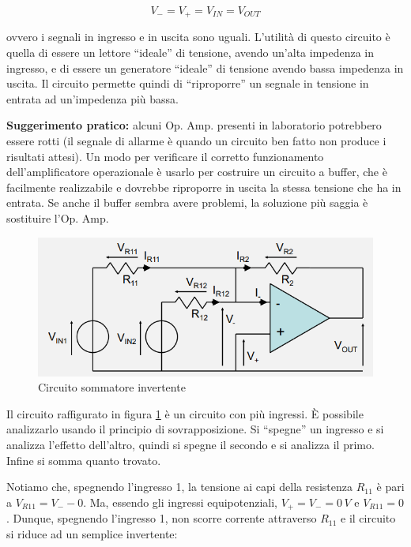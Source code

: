 \documentclass{article}
\begin{document}
\[V_- = V_+ = V_{IN} = V_{OUT}\]

ovvero i segnali in ingresso e in uscita sono uguali. L'utilità di questo circuito è quella di essere un lettore ``ideale'' di tensione, avendo un'alta impedenza in ingresso, e di essere un generatore ``ideale'' di tensione avendo bassa impedenza in uscita. Il circuito permette quindi di ``riproporre'' un segnale in tensione in entrata ad un'impedenza più bassa.

\vspace{3mm}

\textbf{Suggerimento pratico:} alcuni Op. Amp. presenti in laboratorio potrebbero essere rotti (il segnale di allarme è quando un circuito ben fatto non produce i risultati attesi). Un modo per verificare il corretto funzionamento dell'amplificatore operazionale è usarlo per costruire un circuito a buffer, che è facilmente realizzabile e dovrebbe riproporre in uscita la stessa tensione che ha in entrata. Se anche il buffer sembra avere problemi, la soluzione più saggia è sostituire l'Op. Amp.

\clearpage
\begin{figure}[h]
  \centering
  \includegraphics[scale=0.7]{IM_circuito_sommatore_invertente}
  \caption{Circuito sommatore invertente}
  \label{Schema_circuito_sommatore_invertente}
\end{figure}

Il circuito raffigurato in figura \ref{Schema_circuito_sommatore_invertente} è un circuito con più ingressi. È possibile analizzarlo usando il principio di sovrapposizione. Si ``spegne'' un ingresso e si analizza l'effetto dell'altro, quindi si spegne il secondo e si analizza il primo. Infine si somma quanto trovato.

\vspace{3mm}

Notiamo che, spegnendo l'ingresso 1, la tensione ai capi della resistenza $R_{11}$ è pari a $V_{R11} = V_- - 0$. Ma, essendo gli ingressi equipotenziali, $V_+ = V_- = 0 \, V$ e $V_{R11} = 0$. Dunque, spegnendo l'ingresso 1, non scorre corrente attraverso $R_{11}$ e il circuito si riduce ad un semplice invertente:
\end{document}
